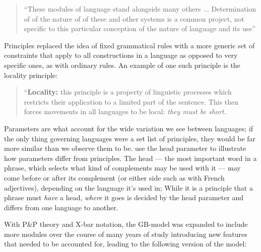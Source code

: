 \documentclass[a4paper,10pt]{article}
\begin{document}
\begin{quote}
	``These modules of language stand alongside many others ... Determination of of the nature of
	of these and other systems is a common project, not specific to this particular conception
	of the nature of language and its use''
	
	\citet{Chomsky95}
\end{quote}

Principles replaced the idea of fixed grammatical rules with a more generic set of constraints that
apply to all constructions in a language as opposed to very specific ones, as with ordinary rules.
\citep[p.~35]{ChUGAI} An example of one such principle is the locality principle:

\begin{quote}
	``\textbf{Locality:} this principle is a property of linguistic processes which restricts their
	application to a limited part of the sentence. This then forces movements in all languages to be
	local: \emph{they must be short.}
	
	\citet[p.~41]{ChUGAI}
\end{quote}

Parameters are what account for the wide variation we see between languages; if the only thing governing
languages were a set list of principles, they would be far more similar than we observe them to be.
\citet[p.~44]{ChUGAI} use the head parameter to illustrate how parameters differ from principles.
The head --- the most important word in a phrase, which selects what kind of complements may
be used with it --- may come before or after its complement (or either side such as with French
adjectives), depending on the language it's used in; While it is a principle that a phrase
must \emph{have} a head, \emph{where} it goes is decided by the head parameter and differs from one
language to another.

With P\&P theory and X-bar notation, the GB-model was expanded to include more modules
over the course of many years of study introducing new features that needed to be accounted for,
leading to the following version of the model:
\end{document}
